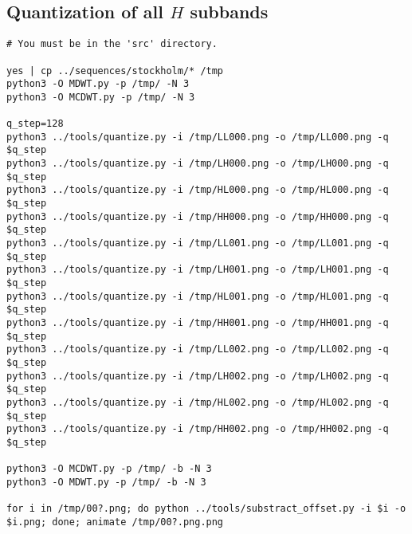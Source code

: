 
\subsection{Quantization of all $H$ subbands}
\begin{verbatim}
# You must be in the 'src' directory.

yes | cp ../sequences/stockholm/* /tmp
python3 -O MDWT.py -p /tmp/ -N 3
python3 -O MCDWT.py -p /tmp/ -N 3

q_step=128
python3 ../tools/quantize.py -i /tmp/LL000.png -o /tmp/LL000.png -q $q_step
python3 ../tools/quantize.py -i /tmp/LH000.png -o /tmp/LH000.png -q $q_step
python3 ../tools/quantize.py -i /tmp/HL000.png -o /tmp/HL000.png -q $q_step
python3 ../tools/quantize.py -i /tmp/HH000.png -o /tmp/HH000.png -q $q_step
python3 ../tools/quantize.py -i /tmp/LL001.png -o /tmp/LL001.png -q $q_step
python3 ../tools/quantize.py -i /tmp/LH001.png -o /tmp/LH001.png -q $q_step
python3 ../tools/quantize.py -i /tmp/HL001.png -o /tmp/HL001.png -q $q_step
python3 ../tools/quantize.py -i /tmp/HH001.png -o /tmp/HH001.png -q $q_step
python3 ../tools/quantize.py -i /tmp/LL002.png -o /tmp/LL002.png -q $q_step
python3 ../tools/quantize.py -i /tmp/LH002.png -o /tmp/LH002.png -q $q_step
python3 ../tools/quantize.py -i /tmp/HL002.png -o /tmp/HL002.png -q $q_step
python3 ../tools/quantize.py -i /tmp/HH002.png -o /tmp/HH002.png -q $q_step

python3 -O MCDWT.py -p /tmp/ -b -N 3
python3 -O MDWT.py -p /tmp/ -b -N 3

for i in /tmp/00?.png; do python ../tools/substract_offset.py -i $i -o $i.png; done; animate /tmp/00?.png.png
\end{verbatim}

